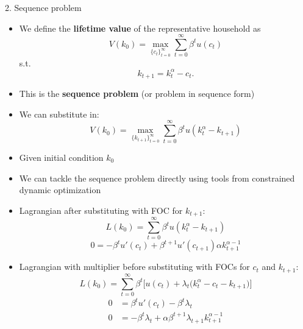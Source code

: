 \documentclass[10pt]{beamer}
\begin{document}
\begin{frame}{2. Sequence problem}
\begin{itemize}
\item We define the \textbf{lifetime value} of the representative household as 
\begin{equation*}
	V(k_0) = \max_{ \{ c_t \}_{t=0}^\infty } \sum_{t = 0}^\infty \beta^t u(c_t)
\end{equation*}
s.t. 
\begin{equation*}
	k_{t+1} = k_t^\alpha - c_t.
\end{equation*}

\item This is the \textbf{sequence problem} (or problem in sequence form)

\item We can substitute in: 
\begin{equation*}
	V(k_0) = \max_{ \{ k_{t+1} \}_{t=0}^\infty } \sum_{t = 0}^\infty \beta^t u(k_t^\alpha  - k_{t+1})
\end{equation*}

\item Given initial condition $k_0$

\end{itemize}
\end{frame}



\begin{frame}{}
\begin{itemize}
\item We can tackle the sequence problem directly using tools from constrained dynamic optimization

\item Lagrangian after substituting with FOC for $k_{t+1}$:
\begin{equation*}
	L(k_0) =  \sum_{t = 0}^\infty \beta^t u(k_t^\alpha  - k_{t+1})
\end{equation*}
\begin{equation*}
	0 = - \beta^t u'(c_t) + \beta^{t+1} u'(c_{t+1}) \alpha k_{t+1}^{\alpha - 1}
\end{equation*}

\item Lagrangian with multiplier before substituting with FOCs for $c_t$ and $k_{t+1}$:
\begin{equation*}
	L(k_0) =  \sum_{t = 0}^\infty \beta^t \bigg[ u(c_t) + \lambda_t \bigg( k_t^\alpha - c_t - k_{t+1} \bigg) \bigg]
\end{equation*}
\begin{align*}
	0 &= \beta^t u'(c_t) - \beta^t \lambda_t \\
	0 &= -\beta^t \lambda_t + \alpha \beta^{t+1} \lambda_{t+1} k_{t+1}^{\alpha - 1}
\end{align*}

\end{itemize}
\end{frame}
\end{document}
